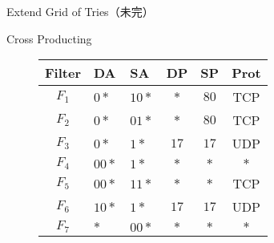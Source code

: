 \documentclass[a4paper,10pt]{jarticle}
\makeatletter
\newcommand{\tblcaption}[1]{\def\@captype{table}\caption{#1}}
\makeatother
\begin{document}
\begin{frame}{Extend Grid of Tries（未完）}

 \begin{figure}
  {\centering
  \scalebox{0.6}{}

  }
 \end{figure}

\end{frame}


\begin{frame}{Cross Producting}

\begin{figure}[h]
 \def\@captype{table}
 \begin{minipage}[t]{.5\textwidth}
  {\scriptsize
  {\centering
  \begin{tabular}{c|l|l|c|c|c} 
   Filter   & DA      & SA     & DP     & SP     & Prot \\ \hline
   $F_{1} $ & $0*$    & $10*$  & $*$    & $80$   & TCP  \\ \hline
   $F_{2} $ & $0*$    & $01*$  & $*$    & $80$   & TCP  \\ \hline
   $F_{3} $ & $0*$    & $1*$   & $17$   & $17$   & UDP \\ \hline
   $F_{4} $ & $00*$   & $1*$   & $*$    & $*$    & $*$ \\ \hline
   $F_{5} $ & $00*$   & $11*$  & $*$    & $*$    & TCP \\ \hline
   $F_{6} $ & $10*$   & $1*$   & $17$   & $17$   & UDP \\ \hline
   $F_{7} $ & $*$     & $00*$  & $*$    & $*$    & $*$
  \end{tabular}

}}
\end{minipage}
\end{figure}
\end{frame}
\end{document}
